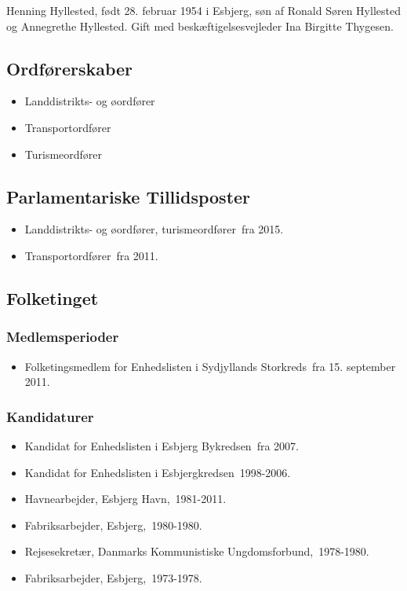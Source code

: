 \documentclass[11pt, a4paper]{awesome-cv}
\begin{document}
\makecvheader[R]
\makelettertitle
\begin{cvletter}
Henning Hyllested, født 28. februar 1954 i Esbjerg, søn af Ronald Søren Hyllested og Annegrethe Hyllested. Gift med beskæftigelsesvejleder Ina Birgitte Thygesen.

\subsection*{Ordførerskaber}
\begin{itemize}
\item Landdistrikts- og øordfører
\item Transportordfører
\item Turismeordfører
\end{itemize}
\subsection*{Parlamentariske Tillidsposter}
\begin{itemize}
\item Landdistrikts- og øordfører, turismeordfører fra 2015.
\item Transportordfører fra 2011.
\end{itemize}
\subsection*{Folketinget}
\subsubsection*{Medlemsperioder}
\begin{itemize}
\item Folketingsmedlem for Enhedslisten i Sydjyllands Storkreds fra 15. september 2011.
\end{itemize}
\subsubsection*{Kandidaturer}
\begin{itemize}
\item Kandidat for Enhedslisten i Esbjerg Bykredsen fra 2007.
\item Kandidat for Enhedslisten i Esbjergkredsen 1998-2006.
\end{itemize}
\begin{itemize}
\item Havnearbejder, Esbjerg Havn, 1981-2011.
\item Fabriksarbejder, Esbjerg, 1980-1980.
\item Rejsesekretær, Danmarks Kommunistiske Ungdomsforbund, 1978-1980.
\item Fabriksarbejder, Esbjerg, 1973-1978.
\end{itemize}
\end{cvletter}
\end{document}

